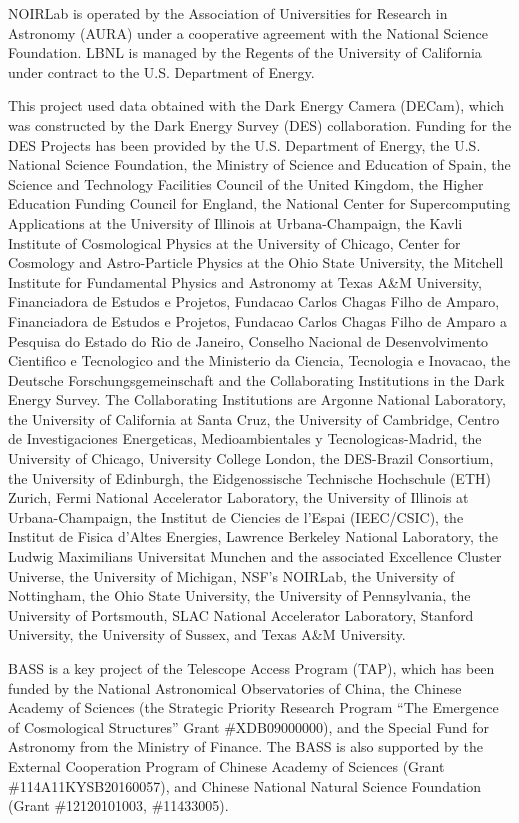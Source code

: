 \documentclass[twocolumn, linenumbers, tra]{aastex631}
\begin{document}
NOIRLab is operated by the Association of Universities for Research in Astronomy (AURA) under a cooperative agreement with the National Science Foundation. LBNL is managed by the Regents of the University of California under contract to the U.S. Department of Energy.

This project used data obtained with the Dark Energy Camera (DECam), which was constructed by the Dark Energy Survey (DES) collaboration. Funding for the DES Projects has been provided by the U.S. Department of Energy, the U.S. National Science Foundation, the Ministry of Science and Education of Spain, the Science and Technology Facilities Council of the United Kingdom, the Higher Education Funding Council for England, the National Center for Supercomputing Applications at the University of Illinois at Urbana-Champaign, the Kavli Institute of Cosmological Physics at the University of Chicago, Center for Cosmology and Astro-Particle Physics at the Ohio State University, the Mitchell Institute for Fundamental Physics and Astronomy at Texas A\&M University, Financiadora de Estudos e Projetos, Fundacao Carlos Chagas Filho de Amparo, Financiadora de Estudos e Projetos, Fundacao Carlos Chagas Filho de Amparo a Pesquisa do Estado do Rio de Janeiro, Conselho Nacional de Desenvolvimento Cientifico e Tecnologico and the Ministerio da Ciencia, Tecnologia e Inovacao, the Deutsche Forschungsgemeinschaft and the Collaborating Institutions in the Dark Energy Survey. The Collaborating Institutions are Argonne National Laboratory, the University of California at Santa Cruz, the University of Cambridge, Centro de Investigaciones Energeticas, Medioambientales y Tecnologicas-Madrid, the University of Chicago, University College London, the DES-Brazil Consortium, the University of Edinburgh, the Eidgenossische Technische Hochschule (ETH) Zurich, Fermi National Accelerator Laboratory, the University of Illinois at Urbana-Champaign, the Institut de Ciencies de l’Espai (IEEC/CSIC), the Institut de Fisica d’Altes Energies, Lawrence Berkeley National Laboratory, the Ludwig Maximilians Universitat Munchen and the associated Excellence Cluster Universe, the University of Michigan, NSF’s NOIRLab, the University of Nottingham, the Ohio State University, the University of Pennsylvania, the University of Portsmouth, SLAC National Accelerator Laboratory, Stanford University, the University of Sussex, and Texas A\&M University.

BASS is a key project of the Telescope Access Program (TAP), which has been funded by the National Astronomical Observatories of China, the Chinese Academy of Sciences (the Strategic Priority Research Program “The Emergence of Cosmological Structures” Grant \#XDB09000000), and the Special Fund for Astronomy from the Ministry of Finance. The BASS is also supported by the External Cooperation Program of Chinese Academy of Sciences (Grant \#114A11KYSB20160057), and Chinese National Natural Science Foundation (Grant \#12120101003, \#11433005).
\end{document}
